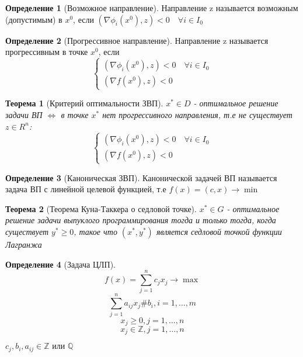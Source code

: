 \documentclass[a4paper]{article}
\newtheorem{theorem}{Теорема}[section]
\theoremstyle{definition}
\newtheorem*{definition}{Определение}
\theoremstyle{remark}
\begin{document}
\begin{definition}[Возможное направление]
	Направление z называется возможным (допустимым) в $x^0$, если $(\nabla \phi_i(x^0), z)<0 \quad \forall i \in I_0$
\end{definition}
\begin{definition}[Прогрессивное направление]
	Направление z называется прогрессивным в точке $x^0$, если
	\[\begin{cases}
			(\nabla \phi_i(x^0), z)<0 \quad \forall i \in I_0 \\
			(\nabla f(x^0), z)<0
		\end{cases}\]
\end{definition}
\begin{theorem}[Критерий оптимальности ЗВП]
	$x^* \in D$ - оптимальное решение задачи ВП $\Leftrightarrow$
	в точке $x^*$ нет прогрессивного направления, т.е не существует $z\in R^n$:
	\[\begin{cases}
			(\nabla \phi_i(x^0), z)<0 \quad \forall i \in I_0 \\
			(\nabla f(x^0), z)<0
		\end{cases}\]
\end{theorem}
\begin{definition}[Каноническая ЗВП]
	Канонической задачей ВП называется задача ВП с линейной целевой функцией, т.е $f(x) = (c, x)\to \min$
\end{definition}
\begin{theorem}[Теорема Куна-Таккера о седловой точке]
	$x^*\in G$ - оптимальное решение задачи выпуклого программирования тогда и только тогда, когда существует $y^* \ge 0$, такое что $(x^*, y^*)$ является седловой точкой функции Лагранжа
\end{theorem}
\begin{definition}[Задача ЦЛП]
	\begin{equation}
		f(x) = \sum_{j=1}^n c_j x_j \to \max
	\end{equation}
	\begin{equation}
		\sum_{j = 1}^n a_{ij}x_j \# b_i, i = 1, \dots, m
	\end{equation}
	\begin{equation}
		x_j \ge 0, j = 1, \dots, n
	\end{equation}
	\begin{equation}
		x_j \in \mathbb{Z}, j =1, \dots, n
	\end{equation}

	\(c_j, b_i, a_{ij} \in \mathbb{Z} \text{ или } \mathbb{Q}\)
\end{definition}
\end{document}
